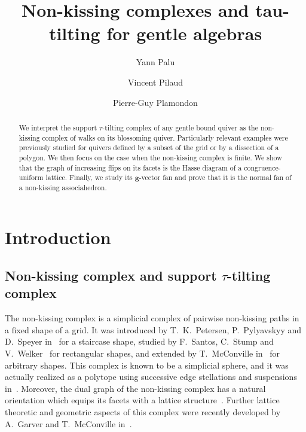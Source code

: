 \documentclass{amsart}
\title{Non-kissing complexes and tau-tilting for gentle algebras}
\author{Yann Palu}
\author{Vincent Pilaud}
\author{Pierre-Guy Plamondon}
\theoremstyle{definition}
\renewcommand{\b}[1]{\mathbf{#1}} %
\begin{document}
\begin{abstract}
We interpret the support $\tau$-tilting complex of any gentle bound quiver as the non-kissing complex of walks on its blossoming quiver.
Particularly relevant examples were previously studied for quivers defined by a subset of the grid or by a dissection of a polygon.
We then focus on the case when the non-kissing complex is finite.
We show that the graph of increasing flips on its facets is the Hasse diagram of a congruence-uniform lattice.
Finally, we study its $\b{g}$-vector fan and prove that it is the normal fan of a non-kissing associahedron.
\end{abstract}


\maketitle

\vspace*{.3cm}
\tableofcontents

\vspace*{-.9cm}
\enlargethispage{.4cm}


\newpage
\section*{Introduction}

\subsection*{Non-kissing complex and support $\tau$-tilting complex}

The non-kissing complex is a simplicial complex of pairwise non-kissing paths in a fixed shape of a grid.
It was introduced by T.~K.~Petersen, P.~Pylyavskyy and D.~Speyer in~\cite{PetersenPylyavskyySpeyer} for a staircase shape, studied by F.~Santos, C.~Stump and V.~Welker~\cite{SantosStumpWelker} for rectangular shapes, and extended by T.~McConville in~\cite{McConville} for arbitrary shapes.
This complex is known to be a simplicial sphere, and it was actually realized as a polytope using successive edge stellations and suspensions in~\cite[Sect.~4]{McConville}.
Moreover, the dual graph of the non-kissing complex has a natural orientation which equips its facets with a lattice structure~\cite[Thm. 1.1, Sect.~5--8]{McConville}.
Further lattice theoretic and geometric aspects of this complex were recently developed by A.~Garver and T.~McConville in~\cite{GarverMcConville-grid}.
\end{document}
